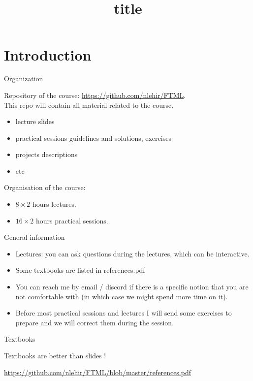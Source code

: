 \documentclass[usenames,dvipsnames]{beamer}
\title[FTML]{title}
\date{} %
\begin{document}
\begin{frame}
\titlepage %
\end{frame}

\section*{Introduction} %
\label{sec:section_name}

\begin{frame}{Organization}

    Repository of the course: \url{https://github.com/nlehir/FTML}.
    \\

    This repo will contain all material related to the course.
    \begin{itemize}
        \item lecture slides
        \item practical sessions guidelines and solutions, exercises
        \item projects descriptions
	\item etc
    \end{itemize}
    
    Organisation of the course:
    \begin{itemize}
        \item $8\times 2$ hours lectures.
        \item $16\times 2$ hours practical sessions.
    \end{itemize}
\end{frame}

\begin{frame}{General information}

    \begin{itemize}
        \item Lectures: you can ask questions during the lectures, which can be interactive.
	\item Some textbooks are listed in references.pdf
	\item You can reach me by email / discord if there is a specific notion that you are not comfortable with (in which case we might spend more time on it).
	\item Before most practical sessions and lectures I will send some exercises to prepare and we will correct them during the session.
    \end{itemize}
\end{frame}


\begin{frame}{Textbooks}

Textbooks are better than slides !

\url{https://github.com/nlehir/FTML/blob/master/references.pdf} 

\end{frame}
\end{document}
